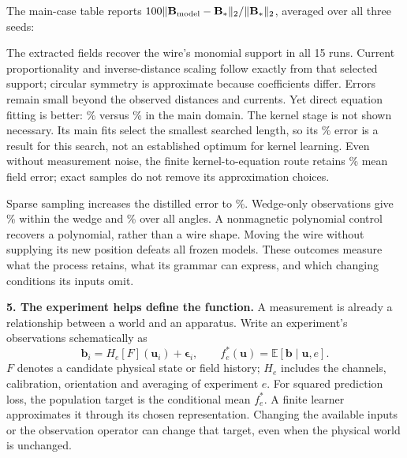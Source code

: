 \documentclass[11pt,letterpaper]{article}
\begin{document}
\vspace{4pt}
The main-case table reports $100\|\mathbf B_{\rm model}-\mathbf B_*\|_2/
\|\mathbf B_*\|_2$, averaged over all three seeds:
\begin{center}
\small
\end{center}
\vspace{-4pt}
The extracted fields recover the wire's monomial support in all 15 runs.
Current proportionality and inverse-distance scaling follow exactly from that
selected support; circular symmetry is approximate because coefficients differ.
Errors remain small beyond the observed distances and currents. Yet direct
equation fitting is better: \WireDirect\% versus \WireEquation\% in the main
domain. The kernel stage is not shown necessary. Its main fits select the smallest
searched length, so its \WireKernel\% error is a result for this search, not an
established optimum for kernel learning.
Even without measurement noise, the finite kernel-to-equation route retains
\NoiselessEquation\% mean field error; exact samples do not remove its approximation choices.

Sparse sampling increases the distilled error to \SparseEquation\%.
Wedge-only observations give \WedgeInside\% within the wedge and
\WedgeOutside\% over all angles. A nonmagnetic polynomial control recovers a
polynomial, rather than a wire shape. Moving the wire without supplying its new
position defeats all frozen models. These outcomes measure what the process
retains, what its grammar can express, and which changing conditions its inputs omit.

\newpage
\textbf{5. The experiment helps define the function.}
A measurement is already a relationship between a world and an apparatus.
Write an experiment's observations schematically as
\begin{equation}
\mathbf b_i=H_e[F](\mathbf u_i)+\boldsymbol\epsilon_i,
\qquad
f_e^*(\mathbf u)=\mathbb E[\mathbf b\mid\mathbf u,e].
\label{eq:observation}
\end{equation}
$F$ denotes a candidate physical state or field history; $H_e$ includes the
channels, calibration, orientation and averaging of experiment $e$.
For squared prediction loss, the population target is the conditional mean
$f_e^*$. A finite learner approximates it through its chosen representation.
Changing the available inputs or the observation operator can change that target,
even when the physical world is unchanged.
\end{document}
